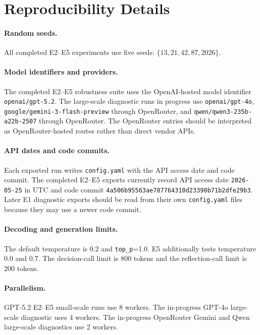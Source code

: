 \ifdefined\FinEvoAllowHistoricalPrePZeroEvidence\else
{}
\fi

\section{Reproducibility Details}
\label{app:reproducibility}

\paragraph{Random seeds.}
All completed E2--E5 experiments use five seeds:
$\{13,21,42,87,2026\}$.

\paragraph{Model identifiers and providers.}
The completed E2--E5 robustness suite uses the OpenAI-hosted model identifier
\texttt{openai/gpt-5.2}.  The large-scale diagnostic runs in progress use
\texttt{openai/gpt-4o}, \texttt{google/gemini-3-flash-preview} through
OpenRouter, and \texttt{qwen/qwen3-235b-a22b-2507} through OpenRouter.  The
OpenRouter entries should be interpreted as OpenRouter-hosted routes rather than
direct vendor APIs.

\paragraph{API dates and code commits.}
Each exported run writes \texttt{config.yaml} with the API access date and code
commit.  The completed E2--E5 exports currently record API access date
\texttt{2026-05-25} in UTC and code commit
\texttt{4a506b95563ae787764310d23390b71b2dfe29b3}.  Later E1 diagnostic exports
should be read from their own \texttt{config.yaml} files because they may use a
newer code commit.

\paragraph{Decoding and generation limits.}
The default temperature is $0.2$ and \texttt{top\_p}=1.0.  E5 additionally
tests temperature 0.0 and 0.7.  The decision-call limit is 800 tokens and the
reflection-call limit is 200 tokens.

\paragraph{Parallelism.}
GPT-5.2 E2--E5 small-scale runs use 8 workers.  The in-progress GPT-4o
large-scale diagnostic uses 4 workers.  The in-progress OpenRouter Gemini and
Qwen large-scale diagnostics use 2 workers.


